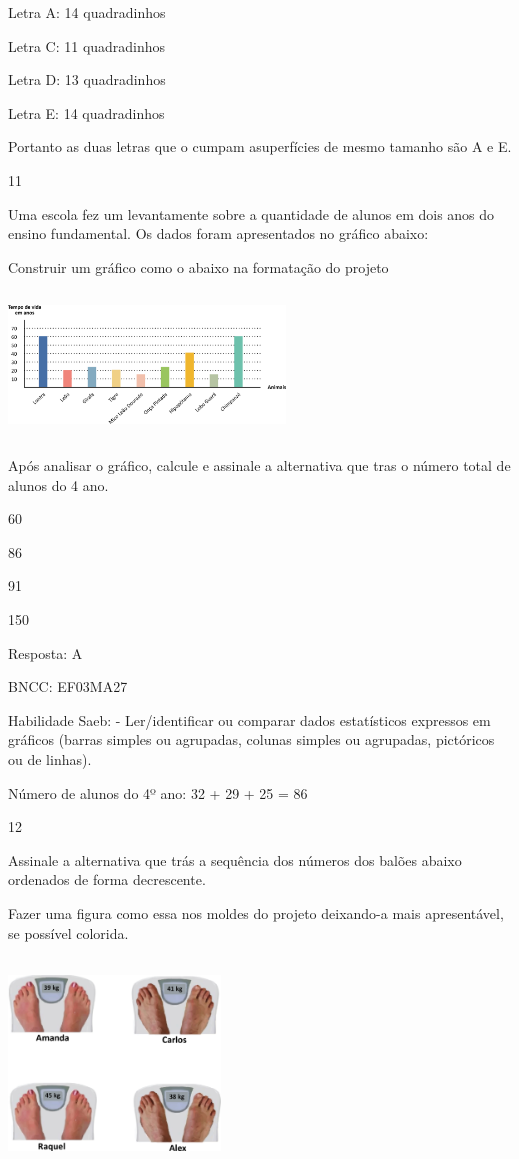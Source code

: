 \begin{escolha}
Letra A: 14 quadradinhos

Letra C: 11 quadradinhos

Letra D: 13 quadradinhos

Letra E: 14 quadradinhos

Portanto as duas letras que o cumpam asuperfícies de mesmo tamanho são A
e E.

\num{11}

Uma escola fez um levantamente sobre a quantidade de alunos em dois anos
do ensino fundamental. Os dados foram apresentados no gráfico abaixo:

Construir um gráfico como o abaixo na formatação do projeto

\includegraphics[width=2.89744in,height=1.52156in]{media/image112.png}

Após analisar o gráfico, calcule e assinale a alternativa que tras o
número total de alunos do 4 ano.

\begin{escolha}
\item
  60
\item
  86
\item
  91
\item
  150
\end{escolha}

Resposta: A

BNCC: EF03MA27

Habilidade Saeb: - Ler/identificar ou comparar dados estatísticos
expressos em gráficos (barras simples ou agrupadas, colunas simples ou
agrupadas, pictóricos ou de linhas).

Número de alunos do 4º ano: 32 + 29 + 25 = 86

\num{12}

Assinale a alternativa que trás a sequência dos números dos balões
abaixo ordenados de forma decrescente.

Fazer uma figura como essa nos moldes do projeto deixando-a mais
apresentável, se possível colorida.

\includegraphics[width=2.21686in,height=2.20852in]{media/image113.png}


\end{escolha}
